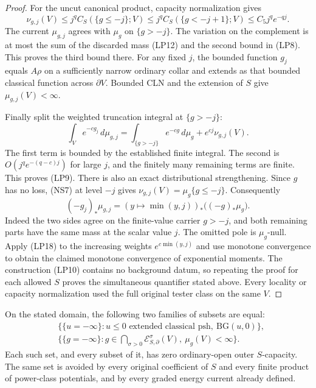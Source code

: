\begin{proof}
For the uncut canonical product, capacity normalization gives
\[
 \nu_{g,j}(V)
       \leq j^q C_S(\{g\leq-j\};V)
       \leq j^q C_S(\{g<-j+1\};V)
       \leq C_5j^q e^{-qj}.
 \tag{LP12}
\]
The current $\mu_{g,j}$ agrees with $\mu_g$ on $\{g>-j\}$.
The variation on the complement is at most the sum of the
discarded mass (LP12) and the second bound in (LP8). This
proves the third bound there. For any fixed $j$, the bounded
function $g_j$ equals $A\rho$ on a sufficiently narrow
ordinary collar and extends as that bounded classical function
across $\partial V$. Bounded CLN and the extension of $S$
give $\mu_{g,j}(V)<\infty$.

Finally split the weighted truncation integral at $\{g>-j\}$:
\[
 \int_V e^{-cg_j}\,d\mu_{g,j}
    =\int_{\{g>-j\}}e^{-cg}\,d\mu_g
                            +e^{cj}\nu_{g,j}(V).
 \tag{LP13}
\]
The first term is bounded by the established finite integral.
The second is $O(j^q e^{-(q-c)j})$ for large $j$, and the
finitely many remaining terms are finite. This proves (LP9).
There is also an exact distributional strengthening. Since
$g$ has no loss, (NS7) at level $-j$ gives
$\nu_{g,j}(V)=\mu_g\{g\leq-j\}$. Consequently
\[
 (-g_j)_*\mu_{g,j}
       =(y\mapsto\min(y,j))_*\bigl((-g)_*\mu_g\bigr).
 \tag{LP18}
\]
Indeed the two sides agree on the finite-value carrier $g>-j$,
and both remaining parts have the same mass at the scalar value
$j$. The omitted pole is $\mu_g$-null. Apply (LP18) to the
increasing weights $e^{c\min(y,j)}$ and use monotone convergence
to obtain the claimed monotone convergence of exponential
moments. The construction (LP10) contains no background datum,
so repeating the proof for each allowed $S$ proves the simultaneous
quantifier stated above.
Every locality or capacity normalization used the full original
tester class on the same $V$.
\end{proof}

\begin{corollary}
\label{cor:r11-all-power-complete-poles}
On the stated domain, the following two families of subsets
are equal:
\[
 \begin{split}
 &\bigl\{\{u=-\infty\}:u\leq0\text{ extended classical psh},
                                  \ \mathrm{BG}(u,0)\bigr\},\\
 &\bigl\{\{g=-\infty\}:g\in\bigcap_{\sigma>0}
       \mathcal E^\sigma_{S,\partial}(V),\ \mu_g(V)<\infty\bigr\}.
 \end{split}
 \tag{LP14}
\]
Each such set, and every subset of it, has zero ordinary-open
outer $S$-capacity. The same set is avoided by every original
coefficient of $S$ and every finite product of power-class
potentials, and by every graded energy current already defined.
\end{corollary}

